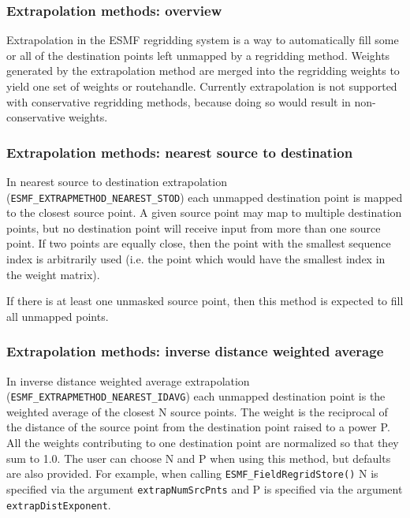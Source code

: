 \subsubsection{Extrapolation methods: overview}\label{sec:extrapolation:overview}

Extrapolation in the ESMF regridding system is a way to automatically fill some or all of the 
destination points left unmapped by a regridding method. Weights generated by
the extrapolation method are merged into the regridding weights to yield one set of weights or 
routehandle. Currently extrapolation is not supported with conservative regridding methods, because 
doing so would result in non-conservative weights. 

\subsubsection{Extrapolation methods: nearest source to destination}\label{sec:extrapolation:neareststod}
In nearest source to destination extrapolation ({\tt ESMF\_EXTRAPMETHOD\_NEAREST\_STOD}) each unmapped 
destination point is mapped to the closest source point. A given source point may map to 
multiple destination points, but no destination point will receive input from more than one source point. 
If two points are equally close, then the point with the smallest sequence index is arbitrarily used 
(i.e. the point which would have the smallest index in the weight matrix). 

If there is at least one unmasked source point, then this method is expected to fill all unmapped points. 

\subsubsection{Extrapolation methods: inverse distance weighted average}\label{sec:extrapolation:nearestidavg}
In inverse distance weighted average extrapolation ({\tt ESMF\_EXTRAPMETHOD\_NEAREST\_IDAVG}) each unmapped 
destination point is the weighted average of the closest N source points. The weight is 
the reciprocal of the distance of the source point from the destination point raised to a power P.
All the weights contributing to one destination point are normalized so that they sum to 1.0. 
The user can choose N and P when using this method, but defaults are also provided. For example, when 
calling {\tt ESMF\_FieldRegridStore()} N is specified via the argument {\tt extrapNumSrcPnts} and 
P is specified via the argument {\tt extrapDistExponent}.  

